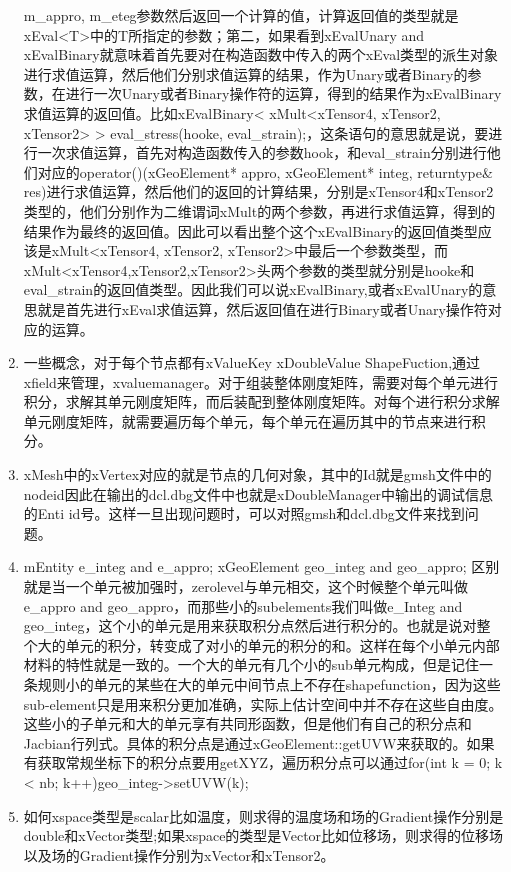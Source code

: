 \documentclass{article}
\begin{document}
\begin{enumerate}
m\_appro, m\_eteg参数然后返回一个计算的值，计算返回值的类型就是xEval<T>中的T所指定的参数；第二，如果看到xEvalUnary
and xEvalBinary就意味着首先要对在构造函数中传入的两个xEval类型的派生对象进行求值运算，然后他们分别求值运算的结果，作为Unary或者Binary的参数，在进行一次Unary或者Binary操作符的运算，得到的结果作为xEvalBinary求值运算的返回值。比如xEvalBinary<
xMult<xTensor4, xTensor2, xTensor2> > eval\_stress(hooke, eval\_strain);，这条语句的意思就是说，要进行一次求值运算，首先对构造函数传入的参数hook，和eval\_strain分别进行他们对应的operator()(xGeoElement{*}
appro, xGeoElement{*} integ, returntype\& res)进行求值运算，然后他们的返回的计算结果，分别是xTensor4和xTensor2类型的，他们分别作为二维谓词xMult的两个参数，再进行求值运算，得到的结果作为最终的返回值。因此可以看出整个这个xEvalBinary的返回值类型应该是xMult<xTensor4,
xTensor2, xTensor2>中最后一个参数类型，而xMult<xTensor4,xTensor2,xTensor2>头两个参数的类型就分别是hooke和eval\_strain的返回值类型。因此我们可以说xEvalBinary,或者xEvalUnary的意思就是首先进行xEval求值运算，然后返回值在进行Binary或者Unary操作符对应的运算。
\item 一些概念，对于每个节点都有xValueKey xDoubleValue ShapeFuction,通过xfield来管理，xvaluemanager。对于组装整体刚度矩阵，需要对每个单元进行积分，求解其单元刚度矩阵，而后装配到整体刚度矩阵。对每个进行积分求解单元刚度矩阵，就需要遍历每个单元，每个单元在遍历其中的节点来进行积分。 
\item xMesh中的xVertex对应的就是节点的几何对象，其中的Id就是gmsh文件中的nodeid因此在输出的dcl.dbg文件中也就是xDoubleManager中输出的调试信息的Enti
id号。这样一旦出现问题时，可以对照gmsh和dcl.dbg文件来找到问题。 
\item mEntity e\_integ and e\_appro; xGeoElement geo\_integ and geo\_appro;
区别就是当一个单元被加强时，zerolevel与单元相交，这个时候整个单元叫做e\_appro and geo\_appro，而那些小的subelements我们叫做e\_Integ
and geo\_integ，这个小的单元是用来获取积分点然后进行积分的。也就是说对整个大的单元的积分，转变成了对小的单元的积分的和。这样在每个小单元内部材料的特性就是一致的。一个大的单元有几个小的sub单元构成，但是记住一条规则小的单元的某些在大的单元中间节点上不存在shapefunction，因为这些sub-element只是用来积分更加准确，实际上估计空间中并不存在这些自由度。这些小的子单元和大的单元享有共同形函数，但是他们有自己的积分点和Jacbian行列式。具体的积分点是通过xGeoElement::getUVW来获取的。如果有获取常规坐标下的积分点要用getXYZ，遍历积分点可以通过for(int
k = 0; k < nb; k++)geo\_integ->setUVW(k); 
\item 如何xspace类型是scalar比如温度，则求得的温度场和场的Gradient操作分别是double和xVector类型;如果xspace的类型是Vector比如位移场，则求得的位移场以及场的Gradient操作分别为xVector和xTensor2。 

\end{enumerate}
\end{document}
